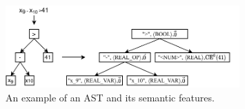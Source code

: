 \begin{figure}[t]
  \centering
  \includegraphics[width=0.8\textwidth]{figures/doping-ast-exp.pdf}
  \caption{An example of an AST and its semantic features.}
  \vspace{-0.2in}
  \label{fig:ast_example}
\end{figure}

